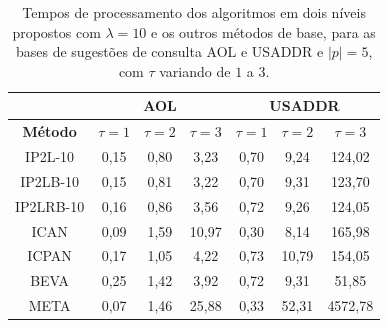 \begin{table}[h]
\centering
\begin{tabular}{c|c|c|c|c|c|c|}
\cline{2-7}
\multicolumn{1}{l|}{} & \multicolumn{3}{c|}{\textbf{AOL}} & \multicolumn{3}{c|}{\textbf{USADDR}} \\ \hline
\multicolumn{1}{|c|}{\textbf{Método}} & $\tau=1$ & $\tau=2$ & $\tau=3$ & $\tau=1$ & $\tau=2$ & $\tau=3$ \\ \hline
\multicolumn{1}{|c|}{IP2L-10} & 0,15 & 0,80 & 3,23 & 0,70 & 9,24 & 124,02 \\ \hline
\multicolumn{1}{|c|}{IP2LB-10} & 0,15 & 0,81 & 3,22 & 0,70 & 9,31 & 123,70 \\ \hline
\multicolumn{1}{|c|}{IP2LRB-10} & 0,16 & 0,86 & 3,56 & 0,72 & 9,26 & 124,05 \\ \hline
\multicolumn{1}{|c|}{ICAN} & 0,09 & 1,59 & 10,97 & 0,30 & 8,14 & 165,98 \\ \hline
\multicolumn{1}{|c|}{ICPAN} & 0,17 & 1,05 & 4,22 & 0,73 & 10,79 & 154,05 \\ \hline
\multicolumn{1}{|c|}{BEVA} & 0,25 & 1,42 & 3,92 & 0,72 & 9,31 & 51,85 \\ \hline
\multicolumn{1}{|c|}{META} & 0,07 & 1,46 & 25,88 & 0,33 & 52,31 & 4572,78 \\ \hline
\end{tabular}
\caption{Tempos de processamento dos algoritmos em dois níveis propostos com $\lambda=10$ e os outros métodos de base, para as bases de sugestões de consulta AOL e USADDR e $|p|=5$, com $\tau$ variando de $1$ a $3$.}
\label{tab:baselines-varying-tau-p-5}
\end{table}

